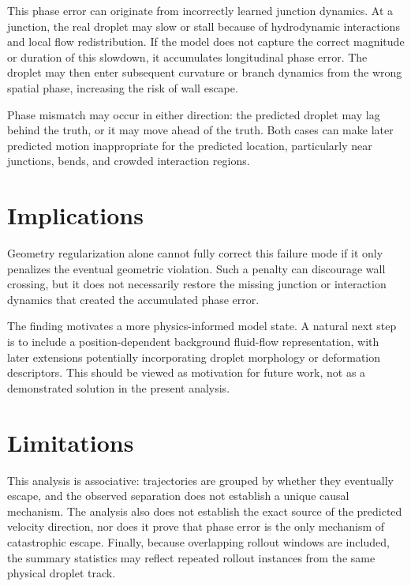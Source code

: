 \documentclass[11pt]{article}
\begin{document}
This phase error can originate from incorrectly learned junction dynamics. At
a junction, the real droplet may slow or stall because of hydrodynamic
interactions and local flow redistribution. If the model does not capture the
correct magnitude or duration of this slowdown, it accumulates longitudinal
phase error. The droplet may then enter subsequent curvature or branch
dynamics from the wrong spatial phase, increasing the risk of wall escape.

Phase mismatch may occur in either direction: the predicted droplet may lag
behind the truth, or it may move ahead of the truth. Both cases can make later
predicted motion inappropriate for the predicted location, particularly near
junctions, bends, and crowded interaction regions.

\section{Implications}

Geometry regularization alone cannot fully correct this failure mode if it
only penalizes the eventual geometric violation. Such a penalty can discourage
wall crossing, but it does not necessarily restore the missing junction or
interaction dynamics that created the accumulated phase error.

The finding motivates a more physics-informed model state. A natural next
step is to include a position-dependent background fluid-flow representation,
with later extensions potentially incorporating droplet morphology or
deformation descriptors. This should be viewed as motivation for future work,
not as a demonstrated solution in the present analysis.

\section{Limitations}

This analysis is associative: trajectories are grouped by whether they
eventually escape, and the observed separation does not establish a unique
causal mechanism. The analysis also does not establish the exact source of the
predicted velocity direction, nor does it prove that phase error is the only
mechanism of catastrophic escape. Finally, because overlapping rollout windows
are included, the summary statistics may reflect repeated rollout instances
from the same physical droplet track.
\end{document}
